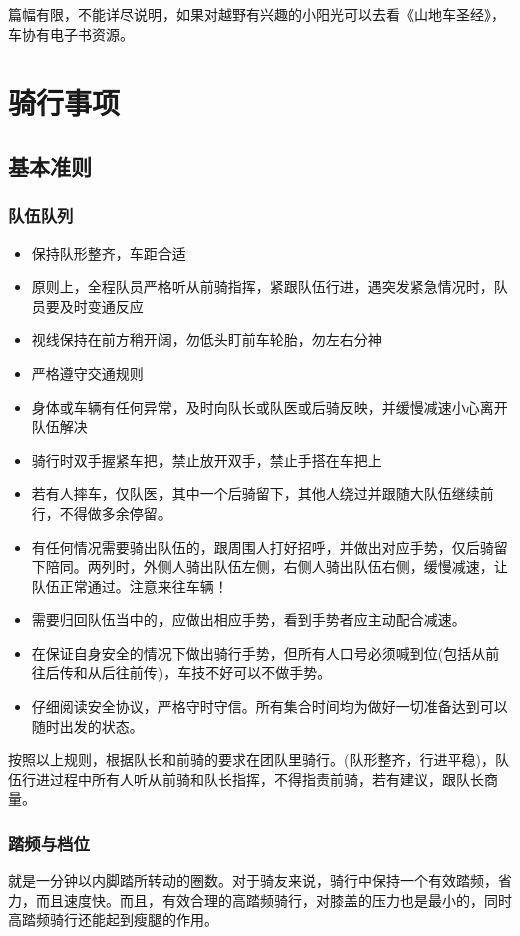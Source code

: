 \documentclass{ctexbook}
\begin{document}
篇幅有限，不能详尽说明，如果对越野有兴趣的小阳光可以去看《山地车圣经》，车协有电子书资源。
\chapter{骑行事项}
\section{基本准则}
\label{sec:基本准则}
\subsection{队伍队列}
\begin{itemize}
    \item 保持队形整齐，车距合适
    \item 原则上，全程队员严格听从前骑指挥，紧跟队伍行进，遇突发紧急情况时，队员要及时变通反应
    \item 视线保持在前方稍开阔，勿低头盯前车轮胎，勿左右分神
    \item 严格遵守交通规则
    \item 身体或车辆有任何异常，及时向队长或队医或后骑反映，并缓慢减速小心离开队伍解决
    \item 骑行时双手握紧车把，禁止放开双手，禁止手搭在车把上
    \item 若有人摔车，仅队医，其中一个后骑留下，其他人绕过并跟随大队伍继续前行，不得做多余停留。
    \item 有任何情况需要骑出队伍的，跟周围人打好招呼，并做出对应手势，仅后骑留下陪同。两列时，外侧人骑出队伍左侧，右侧人骑出队伍右侧，缓慢减速，让队伍正常通过。注意来往车辆！
    \item 需要归回队伍当中的，应做出相应手势，看到手势者应主动配合减速。
    \item 在保证自身安全的情况下做出骑行手势，但所有人口号必须喊到位(包括从前往后传和从后往前传)，车技不好可以不做手势。
    \item 仔细阅读安全协议，严格守时守信。所有集合时间均为做好一切准备达到可以随时出发的状态。
\end{itemize}

按照以上规则，根据队长和前骑的要求在团队里骑行。(队形整齐，行进平稳)，队伍行进过程中所有人听从前骑和队长指挥，不得指责前骑，若有建议，跟队长商量。

\subsection{踏频与档位}

就是一分钟以内脚踏所转动的圈数。对于骑友来说，骑行中保持一个有效踏频，省力，而且速度快。而且，有效合理的高踏频骑行，对膝盖的压力也是最小的，同时高踏频骑行还能起到瘦腿的作用。
\end{document}
